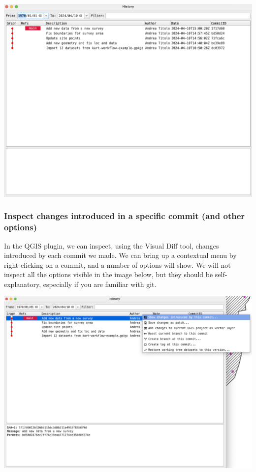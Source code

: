 \documentclass[
  letterpaper,
  DIV=11,
  numbers=noendperiod]{scrartcl}
\begin{document}
\begin{center}
\includegraphics{img/kart-log.png}
\end{center}

\subsubsection{Inspect changes introduced in a specific commit (and
other
options)}\label{inspect-changes-introduced-in-a-specific-commit-and-other-options}

In the QGIS plugin, we can inspect, using the Visual Diff tool, changes
introduced by each commit we made. We can bring up a contextual menu by
right-clicking on a commit, and a number of options will show. We will
not inspect all the options visible in the image below, but they should
be self-explanatory, especially if you are familiar with git.

\begin{center}
\includegraphics{img/kart-log-right-click.png}
\end{center}
\end{document}
